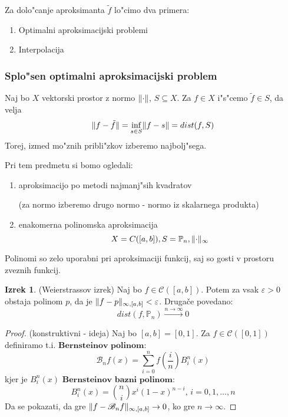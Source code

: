 \documentclass[a4paper,12pt]{article}
\DeclarePairedDelimiter\norm{\lVert}{\rVert}
\theoremstyle{definition}
\newtheorem{theorem}[counter]{Izrek}
\theoremstyle{remark}
\newcommand{\Pp}{\mathbb{P}}
\begin{document}
Za dolo"canje aproksimanta $\tilde{f}$ lo"cimo dva primera:
\begin{enumerate}
    \item Optimalni aproksimacijski problemi
    \item Interpolacija
\end{enumerate}


\subsubsection{Splo"sen optimalni aproksimacijski problem}
Naj bo $X$ vektorski prostor z normo $\norm{\cdot}$, $S \subseteq X$. Za $f \in X$ i"s"cemo $\tilde{f} \in S$, da velja
\begin{equation*}
    \norm{f - \tilde{f}} = \inf_{s \in S} \norm{f - s} = dist(f, S)
\end{equation*}
Torej, izmed mo"znih pribli"zkov izberemo najbolj"sega.


Pri tem predmetu si bomo ogledali:
\begin{enumerate}
    \item aproksimacijo po metodi najmanj"sih kvadratov
    
    (za normo izberemo drugo normo - normo iz skalarnega produkta)
    \item enakomerna polinomska aproksimacija
    \[X = C([a, b]), S = \Pp_n, \norm{\cdot}_{\infty}\]
\end{enumerate}

Polinomi so zelo uporabni pri aproksimaciji funkcij, saj so gosti v prostoru zveznih funkcij.

\begin{theorem} (Weierstrassov izrek)
    Naj bo $f \in \mathscr{C} ([a, b])$. Potem za vsak $\varepsilon > 0$ obstaja polinom $p$, da je $\norm{f - p}_{\infty, [a, b]} < \varepsilon$. Drugače povedano:
    \begin{equation*}
        dist(f, \Pp_n) \stackrel{n \to \infty}{\longrightarrow} 0
    \end{equation*}
\end{theorem}

\begin{proof}(konstruktivni - ideja)
    Naj bo $[a, b] = [0, 1]$. Za $f \in \mathscr{C} ([0, 1])$ definiramo t.i. $\textbf{Bernsteinov polinom}$:
    \begin{equation*}
        \mathscr{B}_n f (x) = \sum_{i = 0}^{n} f (\frac{i}{n}) B_i^n(x)
    \end{equation*}
    kjer je $B_i^n(x)$ $\textbf{Bernsteinov bazni polinom}$:
    \begin{equation*}
        B_i^n (x) = {n \choose i} x^i (1-x)^{n-i} \text{, } i = 0, 1, \dots, n  
    \end{equation*}
    Da se pokazati, da gre $\norm{f - \mathscr{B}_n f}_{\infty, [a, b]} \to 0$, ko gre $n \to \infty$.
\end{proof}
\end{document}
